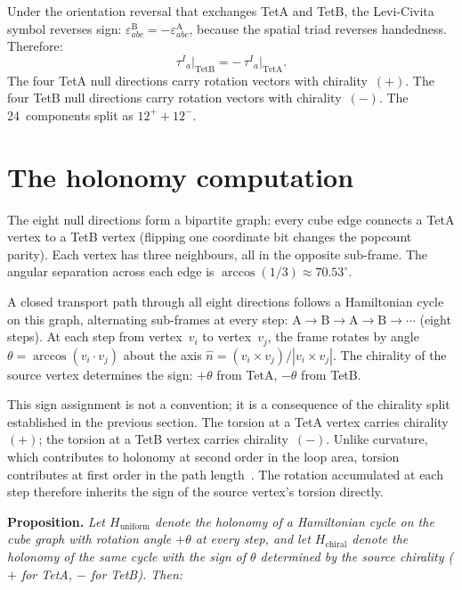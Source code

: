 \documentclass[twocolumn]{iopjournal}
\begin{document}
Under the orientation reversal that exchanges TetA and
TetB, the Levi-Civita symbol reverses sign:
$\varepsilon^{\text{B}}_{abc} =
-\varepsilon^{\text{A}}_{abc}$, because the spatial
triad reverses handedness.  Therefore:
\begin{equation}
  \tau^I{}_a\big|_{\text{TetB}}
  = -\,\tau^I{}_a\big|_{\text{TetA}}.
  \label{eq:flip}
\end{equation}
The four TetA null directions carry rotation vectors
with chirality~$(+)$.  The four TetB null directions
carry rotation vectors with chirality~$(-)$.  The
24~components split as $12^{+} + 12^{-}$.


\section*{The holonomy computation}

The eight null directions form a bipartite graph: every
cube edge connects a TetA vertex to a TetB vertex
(flipping one coordinate bit changes the popcount
parity).  Each vertex has three neighbours, all in the
opposite sub-frame.  The angular separation across each
edge is $\arccos(1/3) \approx 70.53^{\circ}$.

A closed transport path through all eight directions
follows a Hamiltonian cycle on this graph, alternating
sub-frames at every step: $\text{A} \to \text{B} \to
\text{A} \to \text{B} \to \cdots$ (eight steps).
At each step from vertex~$v_i$ to vertex~$v_j$, the
frame rotates by angle
$\theta = \arccos(v_i \cdot v_j)$ about the axis
$\hat{n} = (v_i \times v_j)/|v_i \times v_j|$.  The
chirality of the source vertex determines the sign:
$+\theta$ from TetA, $-\theta$ from TetB.

This sign assignment is not a convention; it is a
consequence of the chirality split established in the
previous section.  The torsion at a TetA vertex
carries chirality~$(+)$; the torsion at a TetB vertex
carries chirality~$(-)$.  Unlike curvature, which
contributes to holonomy at second order in the loop
area, torsion contributes at first order in the path
length~\cite{Hehl1976}.  The rotation accumulated at
each step therefore inherits the sign of the source
vertex's torsion directly.

\medskip
\noindent\textbf{Proposition.}
\textit{Let $H_{\mathrm{uniform}}$ denote the holonomy
of a Hamiltonian cycle on the cube graph with rotation
angle $+\theta$ at every step, and let
$H_{\mathrm{chiral}}$ denote the holonomy of the same
cycle with the sign of $\theta$ determined by the source
chirality ($+$ for TetA, $-$ for TetB).  Then:}
\end{document}
